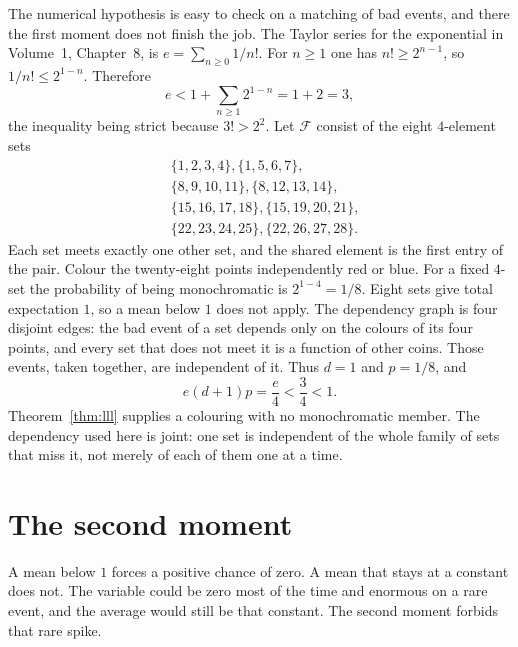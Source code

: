 The numerical hypothesis is easy to check on a matching of bad events, and there the first moment does not finish the job. The Taylor series for the exponential in Volume~1, Chapter~8, is $e=\sum_{n\ge0}1/n!$. For $n\ge1$ one has $n!\ge2^{n-1}$, so $1/n!\le2^{1-n}$. Therefore
\[
 e<1+\sum_{n\ge1}2^{1-n}=1+2=3,
\]
the inequality being strict because $3!>2^{2}$. Let $\mathcal F$ consist of the eight $4$-element sets
\begin{align*}
&\{1,2,3,4\},\{1,5,6,7\},\\
&\{8,9,10,11\},\{8,12,13,14\},\\
&\{15,16,17,18\},\{15,19,20,21\},\\
&\{22,23,24,25\},\{22,26,27,28\}.
\end{align*}
Each set meets exactly one other set, and the shared element is the first entry of the pair. Colour the twenty-eight points independently red or blue. For a fixed $4$-set the probability of being monochromatic is $2^{1-4}=1/8$. Eight sets give total expectation $1$, so a mean below $1$ does not apply. The dependency graph is four disjoint edges: the bad event of a set depends only on the colours of its four points, and every set that does not meet it is a function of other coins. Those events, taken together, are independent of it. Thus $d=1$ and $p=1/8$, and
\[
 e(d+1)p=\frac e4<\frac34<1.
\]
Theorem~\ref{thm:lll} supplies a colouring with no monochromatic member. The dependency used here is joint: one set is independent of the whole family of sets that miss it, not merely of each of them one at a time.

\section{The second moment}

A mean below $1$ forces a positive chance of zero. A mean that stays at a constant does not. The variable could be zero most of the time and enormous on a rare event, and the average would still be that constant. The second moment forbids that rare spike.

